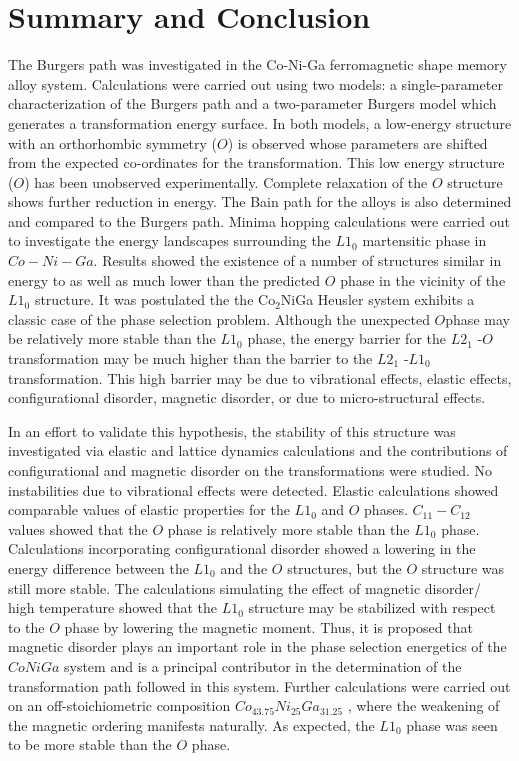\documentclass[%
preprint,
 amsmath,amssymb,
 aps,
prb,
showkeys,
]{revtex4-1}
\begin{document}
\section{Summary and Conclusion}
\label{Sec:summary}
 The Burgers path was investigated in the Co-Ni-Ga ferromagnetic shape memory alloy system. Calculations were carried out using two models: a single-parameter characterization of the Burgers path and a two-parameter Burgers model which generates a transformation energy surface. In both models, a low-energy structure with an orthorhombic symmetry ($O$) is observed whose parameters are shifted from the expected co-ordinates for the transformation. This low energy structure ($O$) has been unobserved experimentally. Complete relaxation of the $O$ structure shows further reduction in energy. The Bain path for the alloys is also determined and compared to the Burgers path. Minima hopping calculations were carried out to investigate the energy landscapes surrounding the $L1_0$ martensitic phase in $Co -  Ni - Ga$. Results showed the existence of a number of structures similar in energy to  as well as much lower than the predicted $O$ phase in the vicinity of the $L1_0$ structure. It was postulated the the Co$_2$NiGa  Heusler 
system exhibits a classic case of the phase selection problem. Although the  unexpected $O$phase may be relatively more stable than the $L1_0$ phase,  the energy barrier for the $L2_1$ -$O$ transformation may be much higher than the barrier to the $L2_1$ -$L1_0$ transformation.  This high barrier 
may be due to vibrational effects, elastic effects, configurational disorder, magnetic disorder, or due to micro-structural effects.  

In an effort to validate this hypothesis, the stability of this structure was investigated via elastic and lattice dynamics calculations  and the contributions of configurational and magnetic disorder on the transformations were studied.  No instabilities due to vibrational effects were detected. Elastic calculations showed comparable values of elastic properties for the $L1_0$ and $O$ phases.  $C_{11}-C_{12}$ values showed that the $O$ phase is relatively more stable than the $L1_0$ phase. Calculations incorporating configurational disorder showed a lowering in the energy difference between the $L1_0$ and the $O$ structures, but the $O$ structure was still more stable. The calculations simulating the effect of magnetic disorder/ high temperature showed that the $L1_0$ structure may be stabilized with respect to the $O$ phase by lowering the magnetic moment. Thus,  it is proposed that magnetic disorder plays an important role in the phase selection energetics of the $CoNiGa$ system and is a principal contributor in the determination of the transformation path followed in this system. Further calculations were carried out on an off-stoichiometric composition $Co_{43.75}Ni_{25}Ga_{31.25}$ , where the weakening of the magnetic ordering manifests naturally. As expected, the $L1_0$ phase was seen to be more stable than the $O$ phase.
\end{document}
